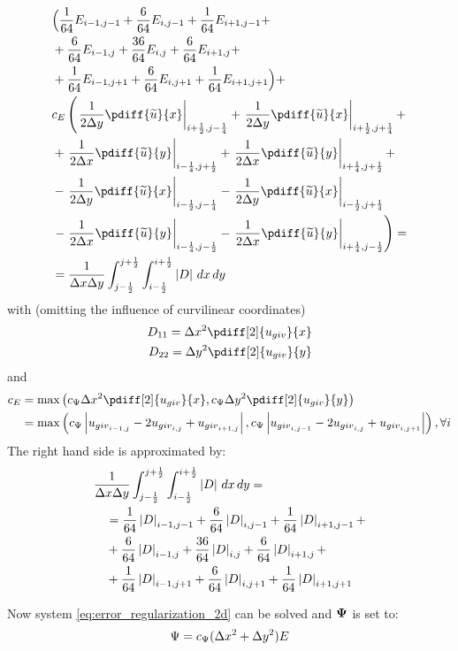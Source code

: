 \begin{align}
        &  \Bigl( \frac{1}{64} E_{i-1,j-1} + \frac{6}{64} E_{i,j-1} + \frac{1}{64} E_{i+1,j-1} +
    \nonumber \\
    & + \frac{6}{64} E_{i-1,j} + \frac{36}{64} E_{i,j} + \frac{6}{64} E_{i+1,j} +
    \nonumber \\
    &  + \frac{1}{64} E_{i-1,j+1} +\frac{6}{64} E_{i,j+1} + \frac{1}{64} E_{i+1,j+1} \Bigl) +
    \nonumber \\
    &
    c_E \left(
      \left. \frac{1}{2\Dy}  \pdiff{\widetilde{u}}{x}  \right|_{i+\half,j-\quart}
    + \left. \frac{1}{2\Dy}  \pdiff{\widetilde{u}}{x}  \right|_{i+\half,j+\quart} +
    \right. \\
    &
    + \left. \frac{1}{2\Dx}  \pdiff{\widetilde{u}}{y}  \right|_{i-\quart,j+\half}
    + \left. \frac{1}{2\Dx}  \pdiff{\widetilde{u}}{y}  \right|_{i+\quart,j+\half} +
    \\
    &
    - \left. \frac{1}{2\Dy}  \pdiff{\widetilde{u}}{x}  \right|_{i-\half,j-\quart}
    - \left. \frac{1}{2\Dy}  \pdiff{\widetilde{u}}{x}  \right|_{i-\half,j+\quart}
    \\
    &
    \left.
    - \left. \frac{1}{2\Dx}  \pdiff{\widetilde{u}}{y}   \right|_{i-\quart,j-\half}
    - \left. \frac{1}{2\Dx}  \pdiff{\widetilde{u}}{y}   \right|_{i+\quart,j-\half}
    \right)
    =
    \nonumber \\
    & = \frac{1}{\Dx\Dy} \int_{j-\half}^{j+\half} \int_{i-\half}^{i+\half} \abs{D} \, dx\, dy
    \label{eq:error_regularization_2d}
\end{align}
with \citep[eq.\ 2]{Borsboom1998} (omitting the influence of curvilinear coordinates)
\begin{align}
    D_{11} = \Dx^2 \pdiff[2]{u_{giv}}{x}
    \\
    D_{22} = \Dy^2 \pdiff[2]{u_{giv}}{y}
\end{align}
and
\begin{align}
    c_E & = \max \left(  c_{\Psi}\Dx^2 \pdiff[2]{u_{giv}}{x},  c_{\Psi}\Dy^2 \pdiff[2]{u_{giv}}{y} \right)
    \nonumber \\
    & =  \max\left(
      c_{\Psi}\abs{u_{{giv}_{i-1,j}} -2 u_{{giv}_{i,j}} + u_{{giv}_{i+1,j}}},
      c_{\Psi}\abs{u_{{giv}_{i,j-1}} -2 u_{{giv}_{i,j}} + u_{{giv}_{i,j+1}}}
    \right), \forall i
\end{align}
The right hand side is approximated by:
\begin{align}
    & \frac{1}{\Delta x\Delta y} \int_{j-\frac{1}{2}}^{j+\frac{1}{2}} \int_{i-\frac{1}{2}}^{i+\frac{1}{2}} \left\lvert D \right\rvert \, dx\, dy
    =
\nonumber \\
& \quad =  \frac{1}{64} \left\lvert D \right\rvert_{i-1,j-1} +
\frac{6}{64} \left\lvert D \right\rvert_{i,j-1} +
\frac{1}{64} \left\lvert D \right\rvert_{i+1,j-1} +
\nonumber \\
    & \quad +
\frac{6}{64} \left\lvert D \right\rvert_{i-1,j} +
\frac{36}{64} \left\lvert D \right\rvert_{i,j} +
\frac{6}{64} \left\lvert D \right\rvert_{i+1,j} +
\nonumber \\
& \quad + \frac{1}{64} \left\lvert D \right\rvert_{i-1,j+1} +
\frac{6}{64} \left\lvert D \right\rvert_{i,j+1} +
\frac{1}{64} \left\lvert D \right\rvert_{i+1,j+1}
\end{align}

Now system \autoref{eq:error_regularization_2d} can be solved and $\boldsymbol{\Psi}$ is set to:
\begin{align}
    \Psi = c_{\Psi}(\Delta x^2 + \Delta y^2) E
\end{align}
